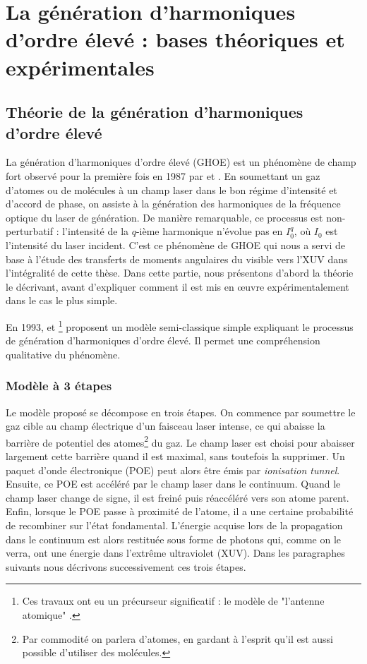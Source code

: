 \part{La génération d'harmoniques d'ordre élevé : bases théoriques et expérimentales}
\label{PA:GHOE}
\chapter{Théorie de la génération d'harmoniques d'ordre élevé}
La génération d'harmoniques d'ordre élevé (GHOE) est un phénomène de champ fort observé pour la première fois en 1987 par  et . En soumettant un gaz d'atomes ou de molécules à un champ laser dans le bon régime d'intensité et d'accord de phase, on assiste à la génération des harmoniques de la fréquence optique du laser de génération. De manière remarquable, ce processus est non-perturbatif : l'intensité de la $q$-ième harmonique n'évolue pas en $I_0^q$, où $I_0$ est l'intensité du laser incident. C'est ce phénomène de GHOE qui nous a servi de base à l'étude des transferts de moments angulaires du visible vers l'XUV dans l'intégralité de cette thèse. Dans cette partie, nous présentons d'abord la théorie le décrivant, avant d'expliquer comment il est mis en œuvre expérimentalement dans le cas le plus simple.

En 1993,  et \footnote{Ces travaux ont eu un précurseur significatif : le modèle de "l'antenne atomique" .} proposent un modèle semi-classique simple expliquant le processus de génération d'harmoniques d'ordre élevé. Il permet une compréhension qualitative du phénomène.

\section{Modèle à 3 étapes}
\label{sec:threestep}
Le modèle proposé se décompose en trois étapes. On commence par soumettre le gaz cible au champ électrique d'un faisceau laser intense, ce qui abaisse la barrière de potentiel des atomes\footnote{Par commodité on parlera d'atomes, en gardant à l'esprit qu'il est aussi possible d'utiliser des molécules.} du gaz. Le champ laser est choisi pour abaisser largement cette barrière quand il est maximal, sans toutefois la supprimer. Un paquet d'onde électronique (POE) peut alors être émis par \textit{ionisation tunnel}. Ensuite, ce POE est accéléré par le champ laser dans le continuum. Quand le champ laser change de signe, il est freiné puis réaccéléré vers son atome parent. Enfin, lorsque le POE passe à proximité de l'atome, il a une certaine probabilité de recombiner sur l'état fondamental. L'énergie acquise lors de la propagation dans le continuum est alors restituée sous forme de photons qui, comme on le verra, ont une énergie dans l'extrême ultraviolet (XUV). Dans les paragraphes suivants nous décrivons successivement ces trois étapes.

